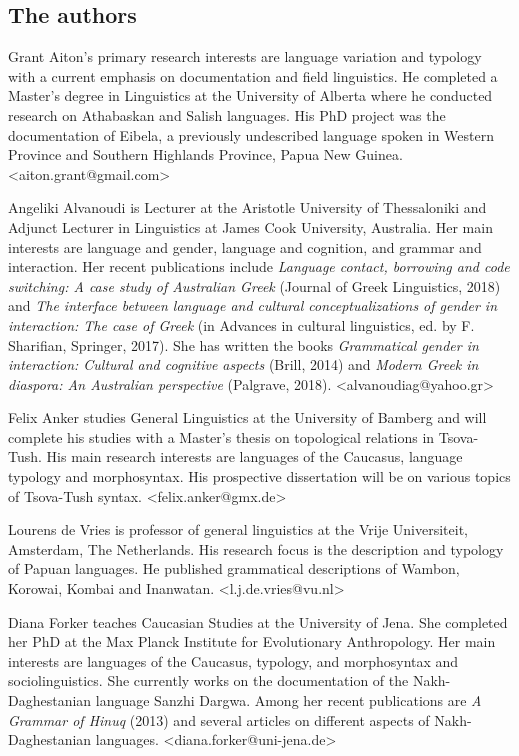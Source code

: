 \begin{refsection}
\subsection*{The authors}

Grant Aiton's primary research interests are language variation and typology with a current emphasis on documentation and field linguistics. He completed a Master's degree in Linguistics at the University of Alberta where he conducted research on Athabaskan and Salish languages. His PhD project was the documentation of Eibela, a previously undescribed language spoken in Western Province and Southern Highlands Province, Papua New Guinea. <aiton.grant@gmail.com>

Angeliki Alvanoudi is Lecturer at the Aristotle University of Thessaloniki and Adjunct Lecturer in Linguistics at James Cook University, Australia. Her main interests are language and gender, language and cognition, and grammar and interaction. Her recent publications include \textit{Language contact, borrowing and code switching: A case study of Australian Greek} (Journal of Greek Linguistics, 2018) and \textit{The interface between language and cultural conceptualizations of gender in interaction: The case of Greek} (in Advances in cultural linguistics, ed. by F. Sharifian, Springer, 2017). She has written the books \textit{Grammatical gender in interaction: Cultural and cognitive aspects} (Brill, 2014) and \textit{Modern Greek in diaspora: An Australian perspective} (Palgrave, 2018). <alvanoudiag@yahoo.gr> 

Felix Anker studies General Linguistics at the University of Bamberg and will complete his studies with a Master’s thesis on topological relations in Tsova-Tush. His main research interests are languages of the Caucasus, language typology and morphosyntax. His prospective dissertation will be on various topics of Tsova-Tush syntax.
<felix.anker@gmx.de>

Lourens de Vries is professor of general linguistics at the Vrije Universiteit, Amsterdam, The Netherlands. His research focus is the description and typology of Papuan languages. He published grammatical descriptions of Wambon, Korowai, Kombai and Inanwatan. <l.j.de.vries@vu.nl>

Diana Forker teaches Caucasian Studies at the University of Jena. She completed her PhD at the Max Planck Institute for Evolutionary Anthropology. Her main interests are languages of the Caucasus, typology, and morphosyntax and sociolinguistics. She currently works on the documentation of the Nakh-Daghestanian language Sanzhi Dargwa. Among her recent publications are \textit{A Grammar of Hinuq} (2013) and several articles on different aspects of Nakh-Daghestanian languages.  <diana.forker@uni-jena.de>


\end{refsection}
